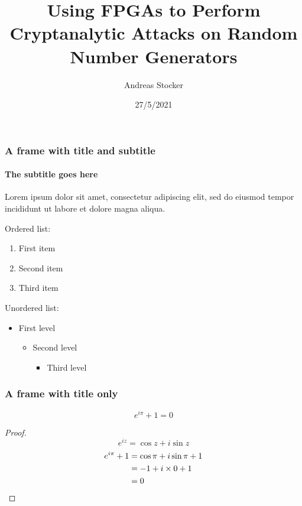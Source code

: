 \documentclass{beamer}
\title{Using FPGAs to Perform Cryptanalytic Attacks on Random Number Generators}
\subtitle{}
\date{27/5/2021}
\author{Andreas Stocker}
\institute{University of Nicosia\par\email{andreas@stockers.org}}
\begin{document}
  \frame[plain]{\titlepage}


  \begin{frame}
    \frametitle{A frame with title and subtitle}
    \framesubtitle{The subtitle goes here}
    Lorem ipsum dolor sit amet, consectetur adipiscing elit, sed do eiusmod tempor incididunt ut labore et dolore magna aliqua.\par
    \vfill
    Ordered list:
    \begin{enumerate}
      \item First item
      \item Second item
      \item Third item
    \end{enumerate}
    \vfill
    Unordered list:
    \begin{itemize}
      \item First level
      \begin{itemize}
        \item Second level
        \begin{itemize}
          \item Third level
        \end{itemize}
      \end{itemize}
    \end{itemize}
  \end{frame}

  

  \begin{frame}
    \frametitle{A frame with title only}
    \begin{theorem}
      \[e^{i\pi}+1=0\]
      \begin{proof}
        \begin{equation*}
          e^{iz}=\cos{z}+i\sin{z}
        \end{equation*}
        \begin{align*}
          e^{i\pi}+1 & \null=\cos\pi+i\sin\pi+1 \\
          & \null=-1+i\times0+1 \\
          & \null=0
        \end{align*}
      \end{proof}
    \end{theorem}
  \end{frame}

  
\end{document}
